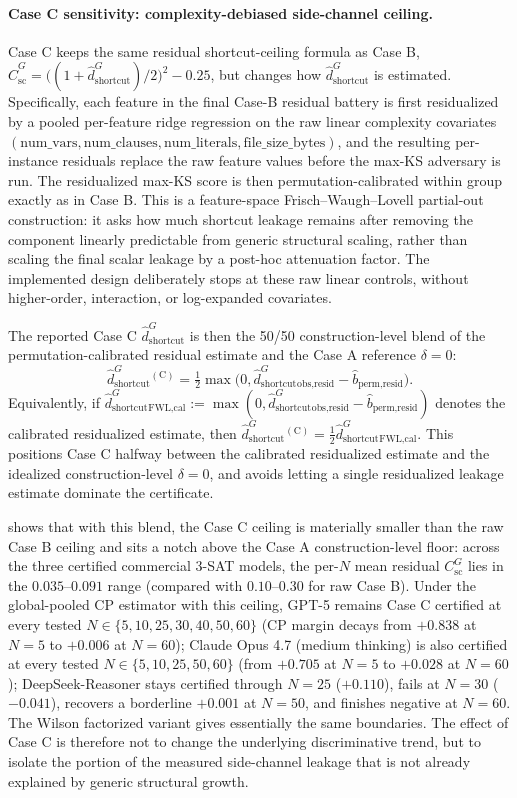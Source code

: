 \documentclass[conference]{IEEEtran}
\theoremstyle{remark}
\newcommand{\shortcutDisc}{d_{\mathrm{shortcut}}^{G}}
\newcommand{\hatshortcutDisc}{\hat d_{\mathrm{shortcut}}^{G}}
\newcommand{\shortcutCeiling}{C_{\mathrm{sc}}^{G}}
\newcommand{\hatshortcutCeiling}{\widehat{C}_{\mathrm{sc}}^{G}}
\begin{document}
\paragraph{Case C sensitivity: complexity-debiased side-channel ceiling.}
Case C keeps the same residual shortcut-ceiling formula as Case B,
$\hatshortcutCeiling=\bigl((1+\hatshortcutDisc)/2\bigr)^2-0.25$,
but changes how $\hatshortcutDisc$ is estimated.
Specifically, each feature in the final Case-B residual battery is first residualized by a pooled per-feature ridge regression on the raw linear complexity covariates $(\text{num\_vars}, \text{num\_clauses}, \text{num\_literals}, \text{file\_size\_bytes})$, and the resulting per-instance residuals replace the raw feature values before the max-KS adversary is run.
The residualized max-KS score is then permutation-calibrated within group exactly as in Case B.  This is a feature-space Frisch--Waugh--Lovell partial-out construction: it asks how much shortcut leakage remains after removing the component linearly predictable from generic structural scaling, rather than scaling the final scalar leakage by a post-hoc attenuation factor.  The implemented design deliberately stops at these raw linear controls, without higher-order, interaction, or log-expanded covariates.

The reported Case C $\hat\shortcutDisc$ is then the 50/50 construction-level blend of the permutation-calibrated residual estimate and the Case A reference $\delta=0$:
\[
\hat\shortcutDisc^{(\text{C})}
=
\tfrac{1}{2}\max\!\bigl(0,\hat\shortcutDisc_{\text{obs,resid}}-\hat b_{\text{perm,resid}}\bigr).
\]
Equivalently, if $\hat\shortcutDisc_{\text{FWL,cal}}:=\max(0,\hat\shortcutDisc_{\text{obs,resid}}-\hat b_{\text{perm,resid}})$ denotes the calibrated residualized estimate, then $\hat\shortcutDisc^{(\text{C})}=\tfrac{1}{2}\hat\shortcutDisc_{\text{FWL,cal}}$.  This positions Case C halfway between the calibrated residualized estimate and the idealized construction-level $\delta=0$, and avoids letting a single residualized leakage estimate dominate the certificate.

 shows that with this blend, the Case C ceiling is materially smaller than the raw Case B ceiling and sits a notch above the Case A construction-level floor: across the three certified commercial 3-SAT models, the per-$N$ mean residual $\shortcutCeiling$ lies in the $0.035$--$0.091$ range (compared with $0.10$--$0.30$ for raw Case B).
Under the global-pooled CP estimator with this ceiling, GPT-5 remains Case C certified at every tested $N\in\{5,10,25,30,40,50,60\}$ (CP margin decays from $+0.838$ at $N=5$ to $+0.006$ at $N=60$); Claude Opus 4.7 (medium thinking) is also certified at every tested $N\in\{5,10,25,50,60\}$ (from $+0.705$ at $N=5$ to $+0.028$ at $N=60$); DeepSeek-Reasoner stays certified through $N=25$ ($+0.110$), fails at $N=30$ ($-0.041$), recovers a borderline $+0.001$ at $N=50$, and finishes negative at $N=60$.
The Wilson factorized variant gives essentially the same boundaries.
The effect of Case C is therefore not to change the underlying discriminative trend, but to isolate the portion of the measured side-channel leakage that is not already explained by generic structural growth.
\end{document}
